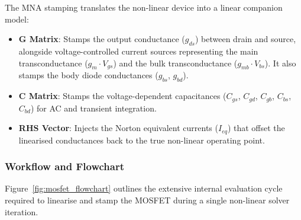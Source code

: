 The MNA stamping translates the non-linear device into a linear companion model:
\begin{itemize}
    \item \textbf{G Matrix}: Stamps the output conductance ($g_{ds}$) between drain and source, alongside voltage-controlled current sources representing the main transconductance ($g_m \cdot V_{gs}$) and the bulk transconductance ($g_{mb} \cdot V_{bs}$). It also stamps the body diode conductances ($g_{bs}$, $g_{bd}$).
    \item \textbf{C Matrix}: Stamps the voltage-dependent capacitances ($C_{gs}$, $C_{gd}$, $C_{gb}$, $C_{bs}$, $C_{bd}$) for AC and transient integration.
    \item \textbf{RHS Vector}: Injects the Norton equivalent currents ($I_{eq}$) that offset the linearised conductances back to the true non-linear operating point.
\end{itemize}

\subsubsection{Workflow and Flowchart}
Figure~\ref{fig:mosfet_flowchart} outlines the extensive internal evaluation cycle required to linearise and stamp the MOSFET during a single non-linear solver iteration.

